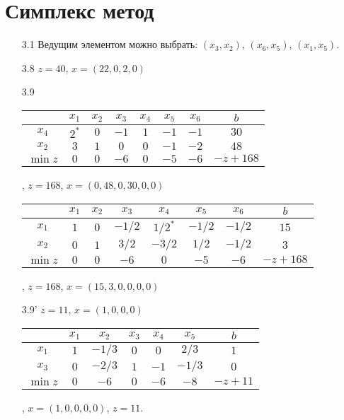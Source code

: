 \documentclass[12pt]{article}
\begin{document}
\section*{Симплекс метод}

\begin{enumerate}
  \item[3.1] Ведущим элементом можно выбрать: $(x_3, x_2)$, $(x_6, x_5)$, $(x_1, x_5)$.
  \item[3.8] $z = 40$, $x = (22, 0, 2, 0)$
  \item[3.9] 
  \begin{tabular}{cccccccc}
    \toprule 
    & $x_1$ & $x_2$ & $x_3$ & $x_4$ & $x_5$ & $x_6$ & $b$ \\
    \midrule 
  $x_4$ & $2^*$ & $0$ & $-1$ & $1$ & $-1$ & $-1$ & $30$ \\ 
  $x_2$ & $3$ & $1$ & $0$ & $0$ & $-1$ & $-2$ & $48$ \\ 
  \midrule
  $\min z$ & $0$ & $0$ & $-6$ & $0$ & $-5$ & $-6$  & $-z + 168$ \\
  \bottomrule
  \end{tabular}, \quad $z = 168$, $x = (0, 48, 0, 30, 0, 0)$

  \begin{tabular}{cccccccc}
    \toprule 
    & $x_1$ & $x_2$ & $x_3$ & $x_4$ & $x_5$ & $x_6$ & $b$ \\
    \midrule 
  $x_1$ & $1$ & $0$ & $-1/2$ & $1/2^*$ & $-1/2$ & $-1/2$ & $15$ \\ 
  $x_2$ & $0$ & $1$ & $3/2$ & $-3/2$ & $1/2$ & $-1/2$ & $3$ \\ 
  \midrule
  $\min z$ & $0$ & $0$ & $-6$ & $0$ & $-5$ & $-6$  & $-z + 168$ \\
  \bottomrule
  \end{tabular}, \quad $z = 168$, $x = (15, 3, 0, 0, 0, 0)$

  \item[3.9'] $z = 11$, $x = (1, 0, 0, 0)$
  
  \begin{tabular}{ccccccc}
    \toprule 
    & $x_1$ & $x_2$ & $x_3$ & $x_4$ & $x_5$ & $b$ \\
    \midrule 
  $x_1$ & $1$ & $-1/3$ & $0$ & $0$ & $2/3$ & $1$ \\ 
  $x_3$ & $0$ & $-2/3$ & $1$ & $-1$ & $-1/3$ & $0$ \\ 
  \midrule
  $\min z$ & $0$ & $-6$ & $0$ & $-6$ & $-8$ & $-z + 11$ \\
  \bottomrule
  \end{tabular}, \quad $x = (1, 0, 0, 0, 0)$, $z=11$.



\end{enumerate}
\end{document}
